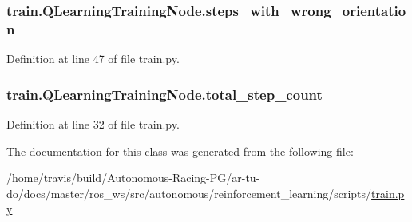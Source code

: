 \subsubsection[{\texorpdfstring{steps\+\_\+with\+\_\+wrong\+\_\+orientation}{steps_with_wrong_orientation}}]{\setlength{\rightskip}{0pt plus 5cm}train.\+Q\+Learning\+Training\+Node.\+steps\+\_\+with\+\_\+wrong\+\_\+orientation}\hypertarget{classtrain_1_1_q_learning_training_node_a87a28e543665823ac18758f6a4460d7a}{}\label{classtrain_1_1_q_learning_training_node_a87a28e543665823ac18758f6a4460d7a}


Definition at line 47 of file train.\+py.

\subsubsection[{\texorpdfstring{total\+\_\+step\+\_\+count}{total_step_count}}]{\setlength{\rightskip}{0pt plus 5cm}train.\+Q\+Learning\+Training\+Node.\+total\+\_\+step\+\_\+count}\hypertarget{classtrain_1_1_q_learning_training_node_aa583fe782e5ae47cc64dd44b92fd2e71}{}\label{classtrain_1_1_q_learning_training_node_aa583fe782e5ae47cc64dd44b92fd2e71}


Definition at line 32 of file train.\+py.



The documentation for this class was generated from the following file\+:\begin{DoxyCompactItemize}
\item 
/home/travis/build/\+Autonomous-\/\+Racing-\/\+P\+G/ar-\/tu-\/do/docs/master/ros\+\_\+ws/src/autonomous/reinforcement\+\_\+learning/scripts/\hyperlink{reinforcement__learning_2scripts_2train_8py}{train.\+py}\end{DoxyCompactItemize}
